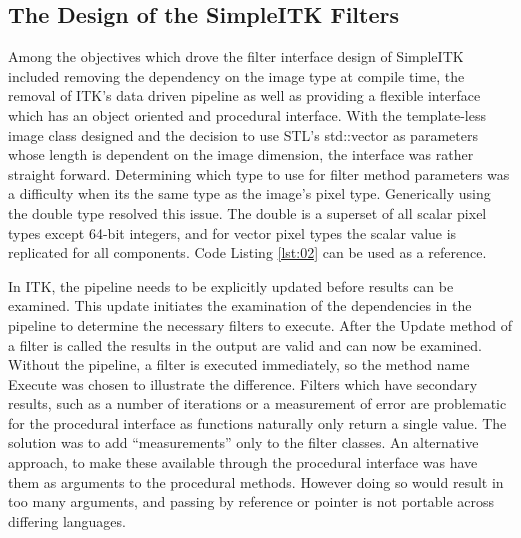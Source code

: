 \documentclass{frontiersMED} %
\begin{document}
\subsection{The Design of the SimpleITK Filters}
Among the objectives which drove the filter interface design of
SimpleITK included removing the dependency on the image type at
compile time, the removal of ITK's data driven pipeline as well as
providing a flexible interface which has an object oriented and
procedural interface. With the template-less image class designed and
the decision to use STL's std::vector as parameters whose length is
dependent on the image dimension, the interface was rather straight
forward. Determining which type to use for filter method parameters
was a difficulty when its the same type as the image's pixel
type. Generically using the double type resolved this issue. The
double is a superset of all scalar pixel types except 64-bit integers,
and for vector pixel types the scalar value is replicated for all
components. Code Listing \ref{lst:02} can be used as a reference.



In ITK, the pipeline needs to be explicitly updated before results can
be examined. This update initiates the examination of the dependencies
in the pipeline to determine the necessary filters to execute. After
the Update method of a filter is called the results in the output are
valid and can now be examined. Without the pipeline, a filter is
executed immediately, so the method name Execute was chosen to
illustrate the difference. Filters which have secondary results, such
as a number of iterations or a measurement of error are problematic
for the procedural interface as functions naturally only return a
single value. The solution was to add “measurements” only to the
filter classes. An alternative approach, to make these available
through the procedural interface was  have them as arguments to the
procedural methods. However doing so would result in too many
arguments, and passing by reference or pointer is not portable across
differing languages.
\end{document}
